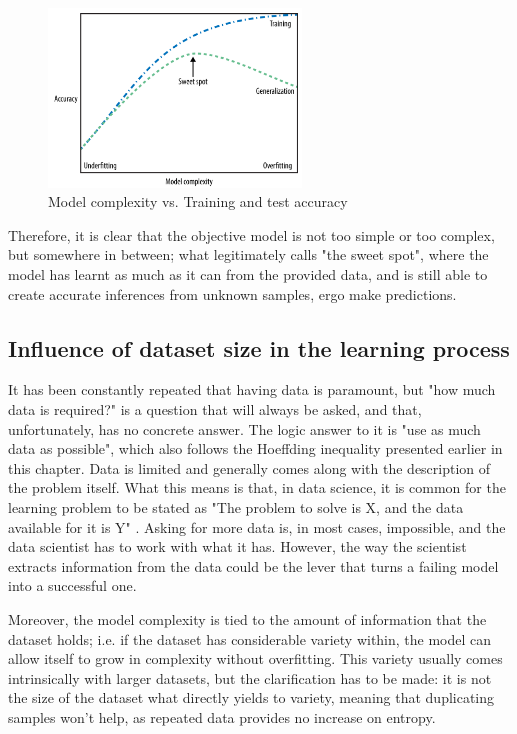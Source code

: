 \begin{figure}[!htb]
    \centering
      \includegraphics[width=0.6\textwidth]{figures/model_complexity}
      \caption{Model complexity vs. Training and test accuracy \cite{Andreas}}
      \label{fig:model_complexity}
\end{figure}

Therefore, it is clear that the objective model is not too simple or too complex, but somewhere in between; what \cite{Andreas} legitimately calls "the sweet spot", where the model has learnt as much as it can from the provided data, and is still able to create accurate inferences from unknown samples, ergo make predictions.


\subsection{Influence of dataset size in the learning process}\label{ch:size}
It has been constantly repeated that having data is paramount, but "how much data is required?" is a question that will always be asked, and that, unfortunately, has no concrete answer. The logic answer to it is "use as much data as possible", which also follows the Hoeffding inequality presented earlier in this chapter. Data is limited and generally comes along with the description of the problem itself. What this means is that, in data science, it is common for the learning problem to be stated as "The problem to solve is X, and the data available for it is Y" \cite{Yaser}. Asking for more data is, in most cases, impossible, and the data scientist has to work with what it has. However, the way the scientist extracts information from the data could be the lever that turns a failing model into a successful one.

Moreover, the model complexity is tied to the amount of information that the dataset holds; i.e. if the dataset has considerable variety within, the model can allow itself to grow in complexity without overfitting. This variety usually comes intrinsically with larger datasets, but the clarification has to be made: it is not the size of the dataset what directly yields to variety, meaning that duplicating samples won't help, as repeated data provides no increase on entropy.

